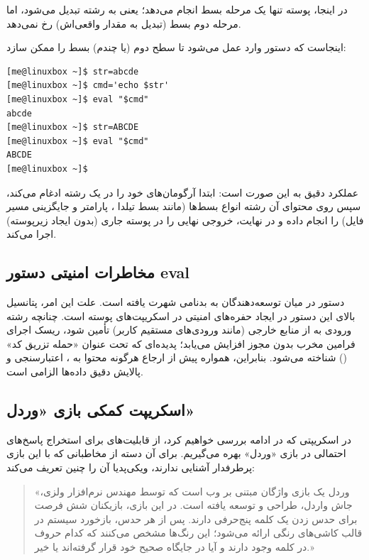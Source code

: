 در اینجا، پوسته تنها یک مرحله بسط انجام می‌دهد؛ یعنی  به رشته  تبدیل می‌شود، اما مرحله دوم بسط (تبدیل  به مقدار واقعی‌اش) رخ نمی‌دهد.

اینجاست که دستور  وارد عمل می‌شود تا سطح دوم (یا چندم) بسط را ممکن سازد:

\begin{latin}
\begin{lstlisting}
[me@linuxbox ~]$ str=abcde
[me@linuxbox ~]$ cmd='echo $str'
[me@linuxbox ~]$ eval "$cmd"
abcde
[me@linuxbox ~]$ str=ABCDE
[me@linuxbox ~]$ eval "$cmd"
ABCDE
[me@linuxbox ~]$
\end{lstlisting}
\end{latin}

عملکرد دقیق  به این صورت است: ابتدا آرگومان‌های خود را در یک رشته ادغام می‌کند، سپس روی محتوای آن رشته انواع بسط‌ها (مانند بسط تیلدا \cmd{\textasciitilde}، پارامتر  و جایگزینی مسیر فایل) را انجام داده و در نهایت، خروجی نهایی را در پوسته جاری (بدون ایجاد زیرپوسته) اجرا می‌کند.

\subsection{مخاطرات امنیتی دستور eval}

دستور  در میان توسعه‌دهندگان به بدنامی شهرت یافته است. علت این امر، پتانسیل بالای این دستور در ایجاد حفره‌های امنیتی در اسکریپت‌های پوسته است. چنانچه رشته ورودی به  از منابع خارجی (مانند ورودی‌های مستقیم کاربر) تأمین شود، ریسک اجرای فرامین مخرب بدون مجوز افزایش می‌یابد؛ پدیده‌ای که تحت عنوان «حمله تزریق کد» () شناخته می‌شود. بنابراین، همواره پیش از ارجاع هرگونه محتوا به ، اعتبارسنجی و پالایش دقیق داده‌ها الزامی است.

\subsection{اسکریپت کمکی بازی «وردل»}

در اسکریپتی که در ادامه بررسی خواهیم کرد، از قابلیت‌های  برای استخراج پاسخ‌های احتمالی در بازی «وردل» بهره می‌گیریم. برای آن دسته از مخاطبانی که با این بازی پرطرفدار آشنایی ندارند، ویکی‌پدیا آن را چنین تعریف می‌کند:

\begin{quote}
«وردل یک بازی واژگان مبتنی بر وب است که توسط مهندس نرم‌افزار ولزی، جاش واردل، طراحی و توسعه یافته است. در این بازی، بازیکنان شش فرصت برای حدس زدن یک کلمه پنج‌حرفی دارند. پس از هر حدس، بازخورد سیستم در قالب کاشی‌های رنگی ارائه می‌شود؛ این رنگ‌ها مشخص می‌کنند که کدام حروف در کلمه وجود دارند و آیا در جایگاه صحیح خود قرار گرفته‌اند یا خیر.»
\end{quote}

